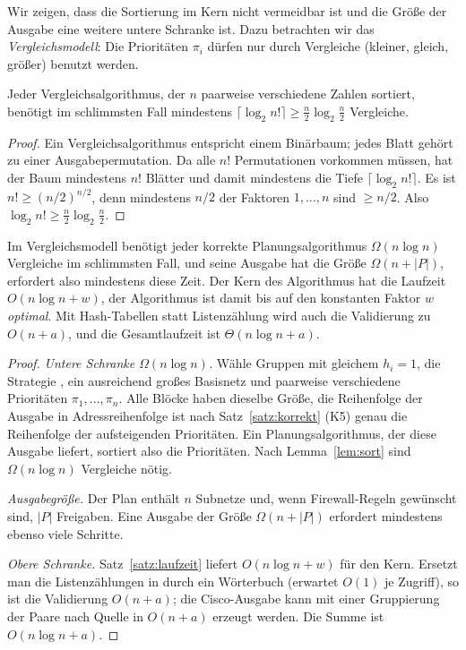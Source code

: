 Wir zeigen, dass die Sortierung im Kern nicht vermeidbar ist und die Größe der Ausgabe eine weitere untere Schranke ist. Dazu betrachten wir das \emph{Vergleichsmodell}: Die Prioritäten $\pi_i$ dürfen nur durch Vergleiche (kleiner, gleich, größer) benutzt werden.

\begin{lemma}
\label{lem:sort}
	Jeder Vergleichsalgorithmus, der $n$ paarweise verschiedene Zahlen sortiert, benötigt im schlimmsten Fall mindestens $\lceil\log_2 n!\rceil \ge \frac{n}{2}\log_2\frac{n}{2}$ Vergleiche.
\end{lemma}

\begin{proof}
	Ein Vergleichsalgorithmus entspricht einem Binärbaum; jedes Blatt gehört zu einer Ausgabepermutation. Da alle $n!$ Permutationen vorkommen müssen, hat der Baum mindestens $n!$ Blätter und damit mindestens die Tiefe $\lceil\log_2 n!\rceil$. Es ist $n! \ge (n/2)^{n/2}$, denn mindestens $n/2$ der Faktoren $1,\ldots,n$ sind $\ge n/2$. Also $\log_2 n! \ge \frac{n}{2}\log_2 \frac{n}{2}$.
\end{proof}

\begin{satz}
\label{satz:optimal}
	Im Vergleichsmodell benötigt jeder korrekte Planungsalgorithmus $\Omega(n\log n)$ Vergleiche im schlimmsten Fall, und seine Ausgabe hat die Größe $\Omega(n + |P|)$, erfordert also mindestens diese Zeit. Der Kern des Algorithmus hat die Laufzeit $O(n\log n + w)$, der Algorithmus ist damit bis auf den konstanten Faktor $w$ \emph{optimal}. Mit Hash-Tabellen statt Listenzählung wird auch die Validierung zu $O(n+a)$, und die Gesamtlaufzeit ist $\Theta(n\log n + a)$.
\end{satz}

\begin{proof}
	\emph{Untere Schranke $\Omega(n\log n)$.} Wähle Gruppen mit gleichem $h_i = 1$, die Strategie , ein ausreichend großes Basisnetz und paarweise verschiedene Prioritäten $\pi_1,\ldots,\pi_n$. Alle Blöcke haben dieselbe Größe, die Reihenfolge der Ausgabe in Adressreihenfolge ist nach Satz~\ref{satz:korrekt} (K5) genau die Reihenfolge der aufsteigenden Prioritäten. Ein Planungsalgorithmus, der diese Ausgabe liefert, sortiert also die Prioritäten. Nach Lemma~\ref{lem:sort} sind $\Omega(n\log n)$ Vergleiche nötig.

	\emph{Ausgabegröße.} Der Plan enthält $n$ Subnetze und, wenn Firewall-Regeln gewünscht sind, $|P|$ Freigaben. Eine Ausgabe der Größe $\Omega(n + |P|)$ erfordert mindestens ebenso viele Schritte.

	\emph{Obere Schranke.} Satz~\ref{satz:laufzeit} liefert $O(n\log n + w)$ für den Kern. Ersetzt man die Listenzählungen in  durch ein Wörterbuch (erwartet $O(1)$ je Zugriff), so ist die Validierung $O(n + a)$; die Cisco-Ausgabe kann mit einer Gruppierung der Paare nach Quelle in $O(n+a)$ erzeugt werden. Die Summe ist $O(n\log n + a)$.
\end{proof}

